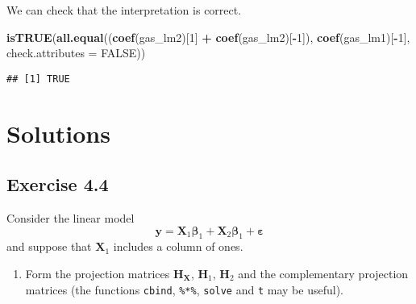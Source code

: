 \documentclass[]{book}
\newenvironment{Shaded}{\begin{snugshade}}{\end{snugshade}}
\newcommand{\DataTypeTok}[1]{\textcolor[rgb]{0.13,0.29,0.53}{#1}}
\newcommand{\DecValTok}[1]{\textcolor[rgb]{0.00,0.00,0.81}{#1}}
\newcommand{\KeywordTok}[1]{\textcolor[rgb]{0.13,0.29,0.53}{\textbf{#1}}}
\newcommand{\NormalTok}[1]{#1}
\newcommand{\OperatorTok}[1]{\textcolor[rgb]{0.81,0.36,0.00}{\textbf{#1}}}
\newcommand{\OtherTok}[1]{\textcolor[rgb]{0.56,0.35,0.01}{#1}}
\newcommand{\StringTok}[1]{\textcolor[rgb]{0.31,0.60,0.02}{#1}}
\providecommand{\tightlist}{%
  \setlength{\itemsep}{0pt}\setlength{\parskip}{0pt}}
\theoremstyle{definition}
\theoremstyle{definition}
\theoremstyle{definition}
\theoremstyle{remark}
\begin{document}
We can check that the interpretation is correct.

\begin{Shaded}
\begin{Highlighting}[]
\KeywordTok{isTRUE}\NormalTok{(}\KeywordTok{all.equal}\NormalTok{((}\KeywordTok{coef}\NormalTok{(gas_lm2)[}\DecValTok{1}\NormalTok{] }\OperatorTok{+}\StringTok{ }\KeywordTok{coef}\NormalTok{(gas_lm2)[}\OperatorTok{-}\DecValTok{1}\NormalTok{]), }
                 \KeywordTok{coef}\NormalTok{(gas_lm1)[}\OperatorTok{-}\DecValTok{1}\NormalTok{], }\DataTypeTok{check.attributes =} \OtherTok{FALSE}\NormalTok{))}
\end{Highlighting}
\end{Shaded}

\begin{verbatim}
## [1] TRUE
\end{verbatim}

\hypertarget{solutions-2}{%
\section{Solutions}\label{solutions-2}}

\hypertarget{exercise-4.4}{%
\subsection{Exercise 4.4}\label{exercise-4.4}}

Consider the linear model \[\boldsymbol{y} = \mathbf{X}_1\boldsymbol{\beta}_1 +\mathbf{X}_2\boldsymbol{\beta}_1 + \boldsymbol{\varepsilon}\] and suppose that \(\mathbf{X}_1\) includes a column of ones.

\begin{Shaded}
\end{Shaded}

\begin{enumerate}
\def\labelenumi{\alph{enumi}.}
\tightlist
\item
  Form the projection matrices \(\mathbf{H}_{\mathbf{X}}\), \(\mathbf{H}_{1}\), \(\mathbf{H}_{2}\) and the complementary projection matrices (the functions \texttt{cbind}, \texttt{\%*\%}, \texttt{solve} and \texttt{t} may be useful).
\end{enumerate}
\end{document}
